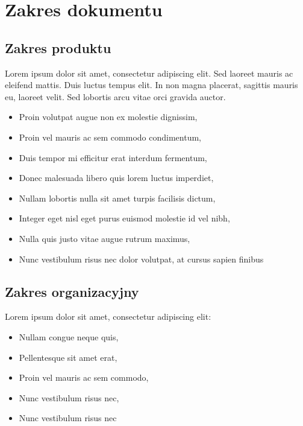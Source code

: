 \documentclass[12pt,a4paper]{book}
\begin{document}
\section{Zakres dokumentu}
\subsection{Zakres produktu}
Lorem ipsum dolor sit amet, consectetur adipiscing elit. Sed laoreet mauris ac eleifend mattis. Duis luctus tempus elit. In non magna placerat, sagittis mauris eu, laoreet velit. Sed lobortis arcu vitae orci gravida auctor. 

\begin{itemize}
    \item Proin volutpat augue non ex molestie dignissim,
    \item Proin vel mauris ac sem commodo condimentum,
    \item Duis tempor mi efficitur erat interdum fermentum,
    \item Donec malesuada libero quis lorem luctus imperdiet,
    \item Nullam lobortis nulla sit amet turpis facilisis dictum,
    \item Integer eget nisl eget purus euismod molestie id vel nibh,
    \item Nulla quis justo vitae augue rutrum maximus,
    \item Nunc vestibulum risus nec dolor volutpat, at cursus sapien finibus
\end{itemize}

\subsection{Zakres organizacyjny}
Lorem ipsum dolor sit amet, consectetur adipiscing elit:
\begin{itemize}
    \item Nullam congue neque quis,
    \item Pellentesque sit amet erat,
    \item Proin vel mauris ac sem commodo,
    \item Nunc vestibulum risus nec,
    \item Nunc vestibulum risus nec
\end{itemize}
\end{document}
